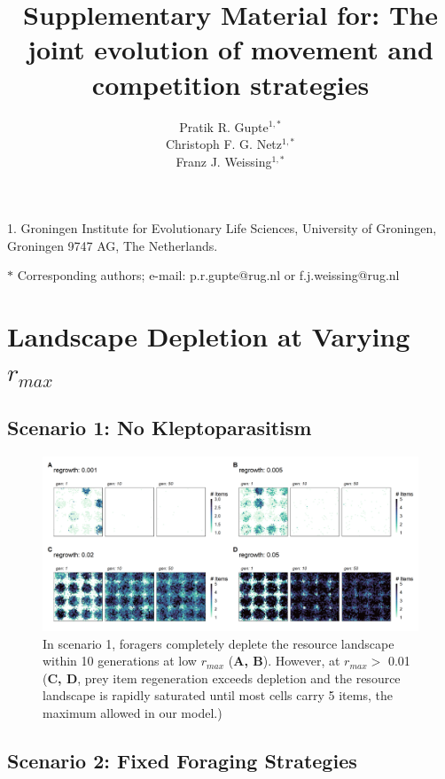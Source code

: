 \documentclass[11pt]{article}
\title{Supplementary Material for: The joint evolution of movement and competition strategies}
\author{Pratik R. Gupte$^{1,\ast}$ \\ 
        Christoph F. G. Netz$^{1,\ast}$ \\ 
        Franz J. Weissing$^{1, \ast}$}
\date{}
\begin{document}
\maketitle

\noindent{} 1. Groningen Institute for Evolutionary Life Sciences, University of Groningen, Groningen 9747 AG, The Netherlands.

\noindent{} $\ast$ Corresponding authors; e-mail: p.r.gupte@rug.nl or f.j.weissing@rug.nl

\bigskip

\newpage

\section{Landscape Depletion at Varying $r_{max}$}

\subsection{Scenario 1: No Kleptoparasitism}

\begin{figure}[h!]
        \centering
        \includegraphics*[width=1.0\textwidth]{figures/fig_landscape_rmax_foragers.png}
        \caption{In scenario 1, foragers completely deplete the resource landscape within 10 generations at low $r_{max}$ (\textbf{A, B}).
        However, at $r_{max} >$ 0.01 (\textbf{C, D}, prey item regeneration exceeds depletion and the resource landscape is rapidly saturated until most cells carry 5 items, the maximum allowed in our model.)}
\end{figure}

\newpage

\subsection{Scenario 2: Fixed Foraging Strategies}
\end{document}
